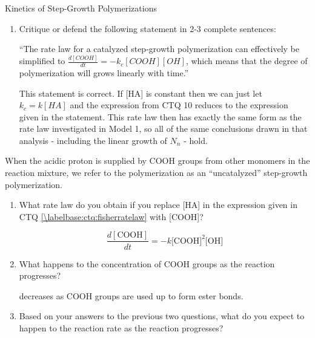 \begin{activity}{Kinetics of Step-Growth Polymerizations}
\begin{ctqs}
\begin{enumerate}
			\item Critique or defend the following statement in 2-3 complete sentences:
			
				``The rate law for a catalyzed step-growth polymerization can effectively be simplified to $\frac{d[COOH]}{dt} = - k_c [COOH][OH]$, which means that the degree of polymerization will grows linearly with time.''
			
				\begin{solution}[1.75in]
				
				This statement is correct.  If [HA] is constant then we can just let $k_c = k[HA]$ and the expression from CTQ 10 reduces to the expression given in the statement.  This rate law then has exactly the same form as the rate law investigated in Model 1, so all of the same conclusions drawn in that analysis - including the linear growth of $N_n$ - hold.
				
				\end{solution}
				
		\end{enumerate}
		
	\question When the acidic proton is supplied by COOH groups from other monomers in the reaction mixture, we refer to the polymerization as an ``uncatalyzed'' step-growth polymerization.
	
		\begin{enumerate}
				
			\item  What rate law do you obtain if you replace [HA] in the expression given in CTQ \ref{\labelbase:ctq:fisherratelaw} with [COOH]?
			
				\begin{solution}[0.75in]	
					\begin{equation*}
						\frac{d[\text{COOH}]}{dt} = - k \text{[COOH]}^2\text{[OH]}
					\end{equation*}
				\end{solution}
		
			\item What happens to the concentration of COOH groups as the reaction progresses?
			
				\begin{solution}[0.75in]	
					[COOH] decreases as COOH groups are used up to form ester bonds.
				\end{solution}
			
			\item Based on your answers to the previous two questions, what do you expect to happen to the reaction rate as the reaction progresses?
			

\end{enumerate}
\end{ctqs}
\end{activity}
